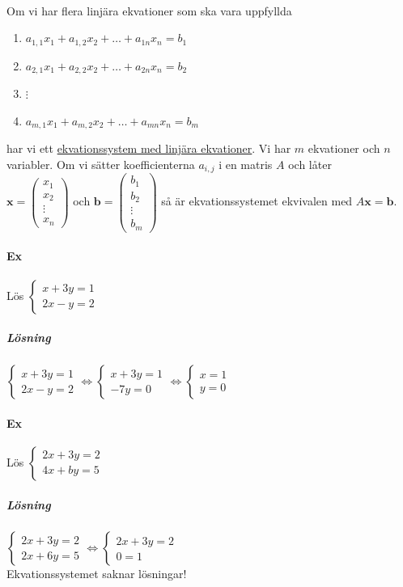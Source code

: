 \paragraph{} Om vi har flera linjära ekvationer som ska vara uppfyllda
\begin{enumerate}
    \item[] $a_{1,1}x_{1}+a_{1,2}x_{2}+\ldots+a_{1n}x_{n}=b_{1}$
    \item[] $a_{2,1}x_{1}+a_{2,2}x_{2}+\ldots+a_{2n}x_{n}=b_{2}$
    \item[] $\vdots$
    \item[] $a_{m,1}x_{1}+a_{m,2}x_{2}+\ldots+a_{mn}x_{n}=b_{m}$  
\end{enumerate}
har vi ett \underline{ekvationssystem med linjära ekvationer}.
Vi har $m$ ekvationer och $n$ variabler.
Om vi sätter koefficienterna $a_{i,j}$ i en matris $A$ och låter\\
$\bm{x}=\begin{pmatrix}
    x_{1}\\x_{2}\\\vdots\\x_{n}
\end{pmatrix}$ och $\bm{b}=\begin{pmatrix}
    b_{1}\\b_{2}\\\vdots\\b_{m}
\end{pmatrix}$ så är ekvationssystemet ekvivalen med $A\bm{x}=\bm{b}$.

\paragraph{Ex} Lös $\begin{cases}x+3y=1\\2x-y=2\end{cases}$
\subparagraph{Lösning} 
$\begin{cases}
    x+3y=1\\
    2x-y=2
\end{cases}\Leftrightarrow
\begin{cases}
    x+3y=1\\
    -7y=0
\end{cases}\Leftrightarrow
\begin{cases}
    x=1\\
    y=0
\end{cases}$

\paragraph{Ex} Lös $\begin{cases}2x+3y=2\\4x+by=5\end{cases}$
\subparagraph{Lösning} 
$\begin{cases}
    2x+3y=2\\
    2x+6y=5
\end{cases}\Leftrightarrow
\begin{cases}
    2x+3y=2\\
    0=1
\end{cases}$\\
Ekvationssystemet saknar lösningar!

